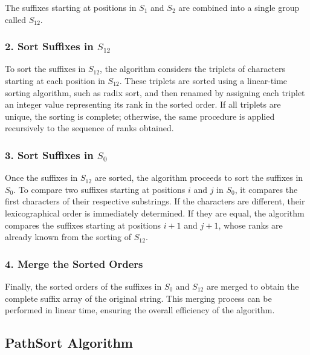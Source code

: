 The suffixes starting at positions in $S_1$ and $S_2$ are combined into a single group called $S_{12}$.

\subsubsection*{2. Sort Suffixes in $S_{12}$}

To sort the suffixes in $S_{12}$, the algorithm considers the triplets of characters starting at each position in $S_{12}$. These triplets are sorted using a linear-time sorting algorithm, such as radix sort, and then renamed by assigning each triplet an integer value representing its rank in the sorted order. If all triplets are unique, the sorting is complete; otherwise, the same procedure is applied recursively to the sequence of ranks obtained.

\subsubsection*{3. Sort Suffixes in $S_0$}

Once the suffixes in $S_{12}$ are sorted, the algorithm proceeds to sort the suffixes in $S_0$. To compare two suffixes starting at positions $i$ and $j$ in $S_0$, it compares the first characters of their respective substrings. If the characters are different, their lexicographical order is immediately determined. If they are equal, the algorithm compares the suffixes starting at positions $i+1$ and $j+1$, whose ranks are already known from the sorting of $S_{12}$.

\subsubsection*{4. Merge the Sorted Orders}

Finally, the sorted orders of the suffixes in $S_0$ and $S_{12}$ are merged to obtain the complete suffix array of the original string. This merging process can be performed in linear time, ensuring the overall efficiency of the algorithm.

\subsection{PathSort Algorithm} \label{sec:pathSort}

